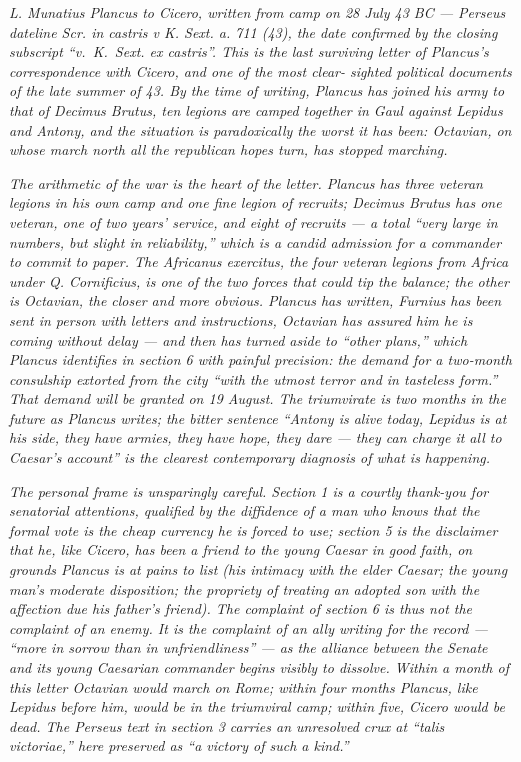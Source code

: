 
\textit{L. Munatius Plancus to Cicero, written from camp
on 28 July 43 BC --- Perseus dateline \textit{Scr. in
castris v K. Sext. a. 711 (43)}, the date confirmed by
the closing subscript ``\textit{v.~K.~Sext. ex castris}''.
This is the last surviving letter of Plancus's
correspondence with Cicero, and one of the most clear-
sighted political documents of the late summer of 43. By
the time of writing, Plancus has joined his army to
that of Decimus Brutus, ten legions are camped together
in Gaul against Lepidus and Antony, and the situation
is paradoxically the worst it has been: Octavian, on
whose march north all the republican hopes turn, has
stopped marching.}

\textit{The arithmetic of the war is the heart of the
letter. Plancus has three veteran legions in his own
camp and one fine legion of recruits; Decimus Brutus
has one veteran, one of two years' service, and eight
of recruits --- a total ``very large in numbers, but
slight in reliability,'' which is a candid admission
for a commander to commit to paper. The Africanus
exercitus, the four veteran legions from Africa under
Q. Cornificius, is one of the two forces that could
tip the balance; the other is Octavian, the closer
and more obvious. Plancus has written, Furnius has
been sent in person with letters and instructions,
Octavian has assured him he is coming without delay
--- and then has turned aside to ``other plans,''
which Plancus identifies in section 6 with painful
precision: the demand for a two-month consulship
extorted from the city ``with the utmost terror and
in tasteless form.'' That demand will be granted on
19 August. The triumvirate is two months in the
future as Plancus writes; the bitter sentence
``Antony is alive today, Lepidus is at his side,
they have armies, they have hope, they dare ---
they can charge it all to Caesar's account'' is the
clearest contemporary diagnosis of what is happening.}

\textit{The personal frame is unsparingly careful.
Section 1 is a courtly thank-you for senatorial
attentions, qualified by the diffidence of a man
who knows that the formal vote is the cheap currency
he is forced to use; section 5 is the disclaimer that
he, like Cicero, has been a friend to the young
Caesar in good faith, on grounds Plancus is at pains
to list (his intimacy with the elder Caesar; the
young man's moderate disposition; the propriety of
treating an adopted son with the affection due his
father's friend). The complaint of section 6 is thus
not the complaint of an enemy. It is the complaint of
an ally writing for the record --- ``more in sorrow
than in unfriendliness'' --- as the alliance between
the Senate and its young Caesarian commander begins
visibly to dissolve. Within a month of this letter
Octavian would march on Rome; within four months
Plancus, like Lepidus before him, would be in the
triumviral camp; within five, Cicero would be dead.
The Perseus text in section 3 carries an unresolved
crux at ``\textit{talis victoriae},'' here preserved
as ``a victory of such a kind.''}

